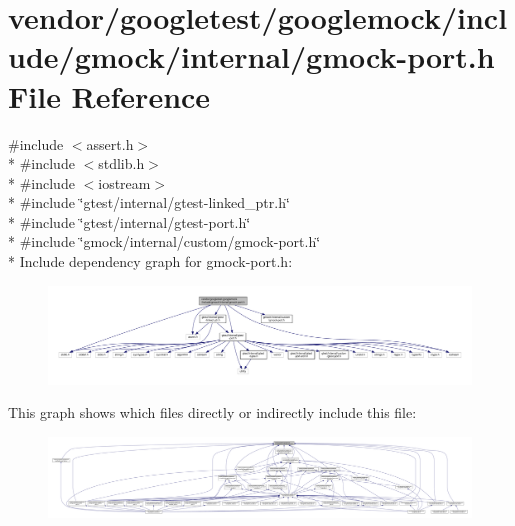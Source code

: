 \hypertarget{gmock-port_8h}{}\section{vendor/googletest/googlemock/include/gmock/internal/gmock-\/port.h File Reference}
\label{gmock-port_8h}
{\ttfamily \#include $<$assert.\+h$>$}\\*
{\ttfamily \#include $<$stdlib.\+h$>$}\\*
{\ttfamily \#include $<$iostream$>$}\\*
{\ttfamily \#include \char`\"{}gtest/internal/gtest-\/linked\+\_\+ptr.\+h\char`\"{}}\\*
{\ttfamily \#include \char`\"{}gtest/internal/gtest-\/port.\+h\char`\"{}}\\*
{\ttfamily \#include \char`\"{}gmock/internal/custom/gmock-\/port.\+h\char`\"{}}\\*
Include dependency graph for gmock-\/port.h\+:\nopagebreak
\begin{figure}[H]
\begin{center}
\leavevmode
\includegraphics[width=350pt]{gmock-port_8h__incl}
\end{center}
\end{figure}
This graph shows which files directly or indirectly include this file\+:\nopagebreak
\begin{figure}[H]
\begin{center}
\leavevmode
\includegraphics[width=350pt]{gmock-port_8h__dep__incl}
\end{center}
\end{figure}
